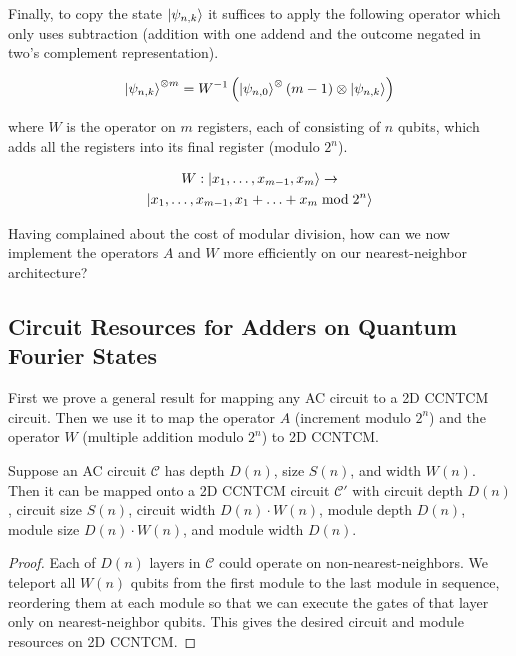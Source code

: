 Finally, to copy the state $\left\vert{\psi_{n,k}}\right\rangle$ it suffices to apply the following
operator which only uses subtraction (addition with one addend and the
outcome negated in two's complement representation).

\begin{equation*}
\left\vert{\psi_{n,k}}\right\rangle^{\otimes m} = W^{-1}\left( \left\vert{\psi_{n,0}}\right\rangle^\otimes(m-1) \otimes \left\vert{\psi_{n,k}}\right\rangle \right)
\end{equation*}

where $W$ is the operator on $m$ registers, each of consisting of $n$ qubits,
which adds all the registers into its final register (modulo $2^n$).

\begin{multline}
W : \left\vert{x_1,\ldots,x_{m-1},x_m}\right\rangle \rightarrow \\
 \left\vert{x_1,\ldots,x_{m-1},x_1+\ldots+x_m \bmod 2^n}\right\rangle
\end{multline}

Having complained about the cost of modular division, how can we now
implement the operators $A$ and $W$ more efficiently on our
nearest-neighbor architecture?

\subsection{Circuit Resources for Adders on Quantum Fourier States}
\label{subsec:qfs-adder}

First we prove a general result for mapping any \textsf{AC} circuit
to a \textsf{2D CCNTCM} circuit.
Then we use it to 
map the operator $A$ (increment modulo $2^n$) and the operator
$W$ (multiple addition modulo $2^n$) to \textsf{2D CCNTCM}.

\begin{lemma}
Suppose an \textsf{AC} circuit $\mathcal{C}$ has
depth $D(n)$, size $S(n)$, and width $W(n)$. Then it can be mapped
onto a \textsf{2D CCNTCM} circuit $\mathcal{C'}$ with circuit depth
$D(n)$, circuit size $S(n)$, circuit width $D(n)\cdot W(n)$,
module depth $D(n)$, module size $D(n)\cdot W(n)$, and module width
$D(n)$.
\label{lem:ac-ccntcm}
\end{lemma}

\begin{proof}
Each of $D(n)$ layers in $\mathcal{C}$ could operate on non-nearest-neighbors.
We teleport all
$W(n)$ qubits from the first module to the last module in sequence,
reordering them at each module so that we can execute the gates of that
layer only on nearest-neighbor qubits.
This gives the desired circuit and module resources on
\textsf{2D CCNTCM}.
\end{proof}

